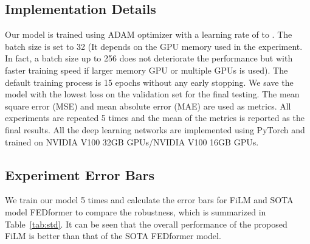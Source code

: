 \documentclass{article}
\begin{document}
\subsection{Implementation Details}
\label{app:exp:implement}
Our model is trained using ADAM \cite{kingma_adam:_2017} optimizer with a learning rate of  to  . The batch size is set to 32 (It depends on the GPU memory used in the experiment. In fact, a batch size up to 256 does not deteriorate the performance but with faster training speed if larger memory GPU or multiple GPUs is used). The default training process is 15 epochs without any early stopping. We save the model with the lowest loss on the validation set for the final testing. The mean square error (MSE) and mean absolute error (MAE) are used as metrics. All experiments are repeated 5 times and the mean of the metrics is reported as the final results. All the deep learning networks are implemented using PyTorch \cite{NEURIPS2019_9015_pytorch} and trained on NVIDIA V100 32GB GPUs/NVIDIA V100 16GB GPUs.

\subsection{Experiment Error Bars}
We train our model 5 times and calculate the error bars for FiLM and SOTA model FEDformer to compare the robustness, which is summarized in Table~\ref{tab:std}. It can be seen that the overall performance of the proposed FiLM is better than that of the SOTA FEDformer model.

\label{app:error_bars}
\vspace{-.2cm}
\begin{table}[ht]
\centering
\caption{MSE with error bars (Mean and STD) for FiLM and FEDformer baseline for multivariate long-term forecasting. All experiments are repeated 5 times.}
\begin{small}
\label{tab:std}
\end{small}
\vskip -0.1in
\end{table}
\end{document}
